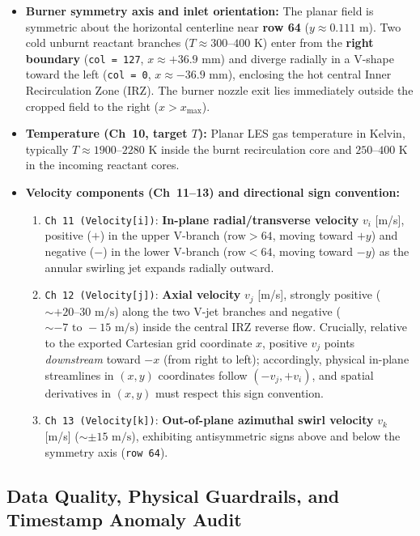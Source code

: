 \begin{itemize}
    \item \textbf{Burner symmetry axis and inlet orientation:} The planar field is symmetric about the horizontal centerline near \textbf{row 64} ($y \approx 0.111\text{ m}$). Two cold unburnt reactant branches ($T \approx 300\text{--}400\text{ K}$) enter from the \textbf{right boundary} (\texttt{col = 127}, $x \approx +36.9\text{ mm}$) and diverge radially in a V-shape toward the left (\texttt{col = 0}, $x \approx -36.9\text{ mm}$), enclosing the hot central Inner Recirculation Zone (IRZ). The burner nozzle exit lies immediately outside the cropped field to the right ($x > x_{\max}$).
    \item \textbf{Temperature (Ch~10, target $T$):} Planar LES gas temperature in Kelvin, typically $T \approx 1900\text{--}2280\text{ K}$ inside the burnt recirculation core and $250\text{--}400\text{ K}$ in the incoming reactant cores.
    \item \textbf{Velocity components (Ch~11--13) and directional sign convention:}
    \begin{enumerate}
        \item \texttt{Ch 11 (Velocity[i])}: \textbf{In-plane radial/transverse velocity} $v_i$ [m/s], positive ($+$) in the upper V-branch ($\text{row} > 64$, moving toward $+y$) and negative ($-$) in the lower V-branch ($\text{row} < 64$, moving toward $-y$) as the annular swirling jet expands radially outward.
        \item \texttt{Ch 12 (Velocity[j])}: \textbf{Axial velocity} $v_j$ [m/s], strongly positive ($\sim +20\text{--}30\text{ m/s}$) along the two V-jet branches and negative ($\sim -7\text{ to }-15\text{ m/s}$) inside the central IRZ reverse flow. Crucially, relative to the exported Cartesian grid coordinate $x$, positive $v_j$ points \emph{downstream} toward $-x$ (from right to left); accordingly, physical in-plane streamlines in $(x, y)$ coordinates follow $(-v_j, +v_i)$, and spatial derivatives in $(x, y)$ must respect this sign convention.
        \item \texttt{Ch 13 (Velocity[k])}: \textbf{Out-of-plane azimuthal swirl velocity} $v_k$ [m/s] ($\sim \pm 15\text{ m/s}$), exhibiting antisymmetric signs above and below the symmetry axis (\texttt{row 64}).
    \end{enumerate}
\end{itemize}

\subsection{Data Quality, Physical Guardrails, and Timestamp Anomaly Audit}
\label{subsec:data_quality}

